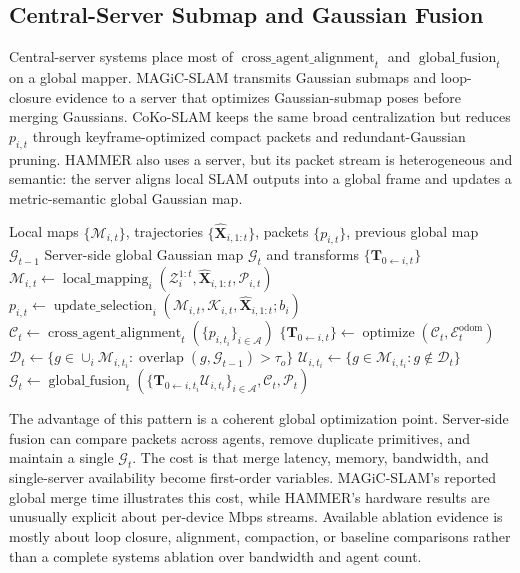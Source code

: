 \documentclass[11pt, a4paper, logo]{googledeepmind}
\begin{document}
\subsection{Central-Server Submap and Gaussian Fusion}

Central-server systems place most of $\operatorname{cross\_agent\_alignment}_t$ and $\operatorname{global\_fusion}_t$ on a global mapper. MAGiC-SLAM transmits Gaussian submaps and loop-closure evidence to a server that optimizes Gaussian-submap poses before merging Gaussians. CoKo-SLAM keeps the same broad centralization but reduces $p_{i,t}$ through keyframe-optimized compact packets and redundant-Gaussian pruning. HAMMER also uses a server, but its packet stream is heterogeneous and semantic: the server aligns local SLAM outputs into a global frame and updates a metric-semantic global Gaussian map.

\begin{algorithm}[H]
\caption{Central-server submap and Gaussian fusion pattern}
\label{alg:taxonomy-central-server}
\small
\begin{algorithmic}[1]
  \Require Local maps $\{\mathcal{M}_{i,t}\}$, trajectories $\{\hat{\mathbf{X}}_{i,1:t}\}$, packets $\{p_{i,t}\}$, previous global map $\mathcal{G}_{t-1}$
  \Ensure Server-side global Gaussian map $\mathcal{G}_t$ and transforms $\{\mathbf{T}_{0\leftarrow i,t}\}$
  \State $\mathcal{M}_{i,t} \gets \operatorname{local\_mapping}_i(\mathcal{Z}_i^{1:t},\hat{\mathbf{X}}_{i,1:t},\mathcal{P}_{i,t})$ 
  \State $p_{i,t} \gets \operatorname{update\_selection}_i(\mathcal{M}_{i,t},\mathcal{K}_{i,t},\hat{\mathbf{X}}_{i,1:t};b_i)$ 
  \State $\mathcal{C}_t \gets \operatorname{cross\_agent\_alignment}_t(\{p_{i,t_i}\}_{i\in\mathcal{A}})$ 
  \State $\{\mathbf{T}_{0\leftarrow i,t}\} \gets \operatorname{optimize}(\mathcal{C}_t,\mathcal{E}^{\mathrm{odom}}_t)$ 
  \State $\mathcal{D}_t \gets \{g\in\cup_i\mathcal{M}_{i,t_i}:\operatorname{overlap}(g,\mathcal{G}_{t-1})>\tau_o\}$ 
  \State $\mathcal{U}_{i,t_i} \gets \{g\in\mathcal{M}_{i,t_i}:g\notin\mathcal{D}_t\}$ 
  \State $\mathcal{G}_t \gets \operatorname{global\_fusion}_t(\{\mathbf{T}_{0\leftarrow i,t_i}\mathcal{U}_{i,t_i}\}_{i\in\mathcal{A}},\mathcal{C}_t,\mathcal{P}_t)$ 
\end{algorithmic}
\end{algorithm}

The advantage of this pattern is a coherent global optimization point. Server-side fusion can compare packets across agents, remove duplicate primitives, and maintain a single $\mathcal{G}_t$. The cost is that merge latency, memory, bandwidth, and single-server availability become first-order variables. MAGiC-SLAM's reported global merge time illustrates this cost, while HAMMER's hardware results are unusually explicit about per-device Mbps streams. Available ablation evidence is mostly about loop closure, alignment, compaction, or baseline comparisons rather than a complete systems ablation over bandwidth and agent count.
\end{document}
